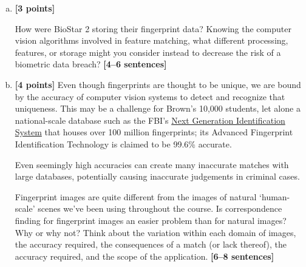 \documentclass[11pt]{article}
\begin{document}
\begin{enumerate}[(a)]
    \item \textbf{[3 points]}
    \begin{tcolorbox}[colback=orange!5!white,colframe=orange!75!black]
    How were BioStar 2 storing their fingerprint data? Knowing the computer vision algorithms involved in feature matching, what different processing, features, or storage might you consider instead to decrease the risk of a biometric data breach? \textbf{[4--6 sentences]}
    \end{tcolorbox}


    \pagebreak
    \item 
    \textbf{[4 points]}
Even though fingerprints are thought to be unique, we are bound by the accuracy of computer vision systems to detect and recognize that uniqueness.
This may be a challenge for Brown's 10,000 students, let alone a national-scale database such as the FBI's \href{https://www.fbi.gov/services/cjis/fingerprints-and-other-biometrics/ngi}{Next Generation Identification System} that houses over 100 million fingerprints; its Advanced Fingerprint Identification Technology is claimed to be 99.6\% accurate.

Even seemingly high accuracies can create many inaccurate matches with large databases, potentially causing inaccurate judgements in criminal cases. 

    \begin{tcolorbox}[colback=orange!5!white,colframe=orange!75!black]
    Fingerprint images are quite different from the images of natural ‘human-scale’ scenes we've been using throughout the course. Is correspondence finding for fingerprint images an easier problem than for natural images? Why or why not? Think about the variation within each domain of images, the accuracy required, the consequences of a match (or lack thereof), the accuracy required, and the scope of the application. \textbf{[6--8 sentences]}


\end{tcolorbox}
\end{enumerate}
\end{document}
